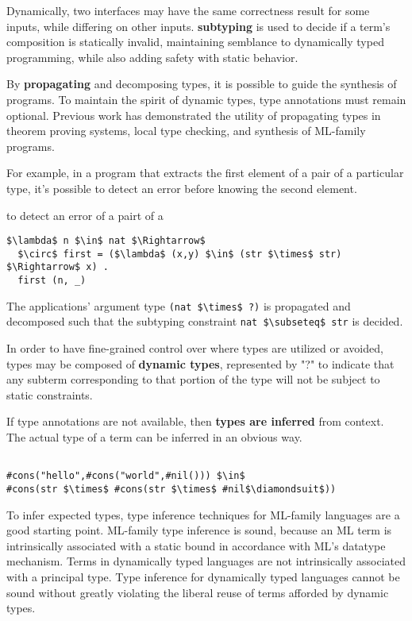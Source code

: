 \documentclass[sigplan,screen]{acmart}
\begin{document}
Dynamically, two interfaces may have the same correctness result for some inputs,
while differing on other inputs. \textbf{subtyping} is used to decide if a term's 
composition is statically invalid, maintaining semblance to dynamically typed programming,
while also adding safety with static behavior.

By \textbf{propagating} and decomposing types, 
it is possible to guide the synthesis of programs.
To maintain the spirit of dynamic types, type annotations must remain optional.
Previous work has demonstrated the utility of propagating types 
in theorem proving systems, local type checking, 
and synthesis of ML-family programs.

For example, in a program that extracts 
the first element of a pair of a particular type, 
it's possible to detect an error before knowing the second element.

to detect an error of a pairt of a   
\begin{lstlisting}
$\lambda$ n $\in$ nat $\Rightarrow$
  $\circ$ first = ($\lambda$ (x,y) $\in$ (str $\times$ str) $\Rightarrow$ x) .
  first (n, _) 
\end{lstlisting}

\noindent The  applications' argument type \lstinline{(nat $\times$ ?)} 
is propagated and decomposed such that the subtyping constraint 
\lstinline{nat $\subseteq$ str} is decided. 

In order to have fine-grained control over where types are utilized or avoided, 
types may be composed of \textbf{dynamic types}, represented by "?" to indicate 
that any subterm corresponding to that portion of the type 
will not be subject to static constraints.

If type annotations are not available, then \textbf{types are inferred} from context. 
The actual type of a term can be inferred in an obvious way.  

\begin{lstlisting}

#cons("hello",#cons("world",#nil())) $\in$ 
#cons(str $\times$ #cons(str $\times$ #nil$\diamondsuit$))

\end{lstlisting}

To infer expected types, type inference techniques for ML-family languages 
are a good starting point.
ML-family type inference is sound, because an ML term is 
intrinsically associated with a static bound in accordance with ML's datatype mechanism.
Terms in dynamically typed languages are not intrinsically associated with a principal type. 
Type inference for dynamically typed languages cannot be sound without greatly violating the 
liberal reuse of terms afforded by dynamic types. 
\end{document}
